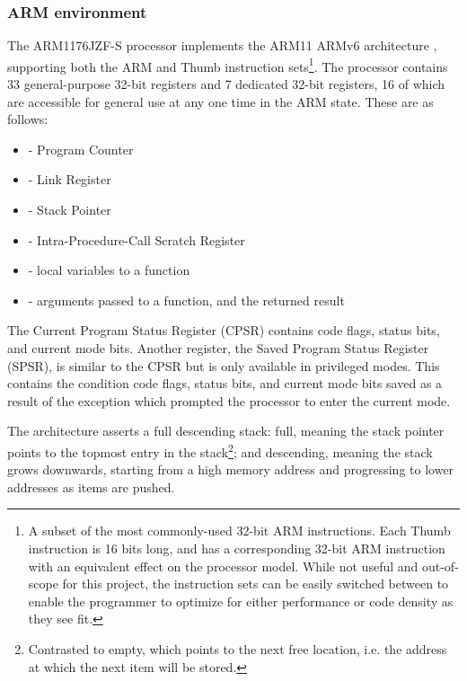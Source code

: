     \subsubsection{ARM environment}
       The ARM1176JZF-S processor implements the ARM11 ARMv6 architecture
       \cite{TRM}, supporting both the ARM and Thumb instruction sets\footnote{A
       subset of the most commonly-used 32-bit ARM instructions.  Each Thumb
       instruction is 16 bits long, and has a corresponding 32-bit ARM
       instruction with an equivalent effect on the processor model. While not
       useful and out-of-scope for this project, the instruction sets can be
       easily switched between to enable the programmer to optimize for either
       performance or code density as they see fit.}. The processor contains 33
       general-purpose 32-bit registers and 7 dedicated 32-bit registers, 16 of
       which are accessible for general use at any one time in the ARM state.
       These are as follows:
       \begin{itemize}
           \itemsep0em
           \item {} - Program Counter
           \item {} - Link Register
           \item {} - Stack Pointer
           \item {} - Intra-Procedure-Call Scratch Register
           \item {} - local variables to a function
           \item {} - arguments passed to a function, and the returned
               result
       \end{itemize}

       The Current Program Status Register (CPSR) contains code flags, status
       bits, and current mode bits.  Another register, the Saved Program Status
       Register (SPSR), is similar to the CPSR but is only available in
       privileged modes. This contains the condition code flags, status bits,
       and current mode bits saved as a result of the exception which prompted
       the processor to enter the current mode.

       The architecture asserts a full descending stack: full, meaning
       the stack pointer points to the topmost entry in the
       stack\footnote{Contrasted to empty, which points to the next free
       location, i.e. the address at which the next item will be stored.};
       and descending, meaning the stack grows downwards, starting from a high
       memory address and progressing to lower addresses as items are pushed.

